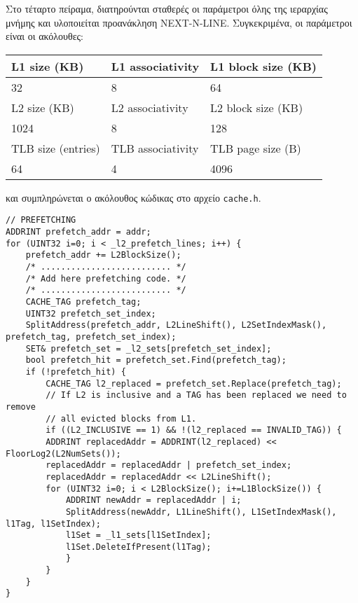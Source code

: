 \documentclass{article}
\newcommand{\eng}[1]{\foreignlanguage{english}{#1}}
\begin{document}
Στο τέταρτο πείραμα, διατηρούνται σταθερές οι παράμετροι όλης της ιεραρχίας μνήμης και υλοποιείται προανάκληση \eng{NEXT-N-LINE}. Συγκεκριμένα, οι παράμετροι είναι οι ακόλουθες:

\begin{table}[h]
    \centering
    \begin{tabular}{|p{3cm}|p{3cm}|p{3cm}|}
        \hline
        L1 size (KB) & L1 associativity & L1 block size (KB)\\
        \hline
        \hline
        32 & 8 & 64\\
        L2 size (KB) & L2 associativity & L2 block size (KB)\\
        \hline
        \hline
        1024 & 8 & 128\\
        \hline
        TLB size (entries) & TLB associativity & TLB page size (B)\\
        \hline    
        \hline
        64 & 4 & 4096\\
        \hline
    \end{tabular}
\end{table}
\FloatBarrier

και συμπληρώνεται ο ακόλουθος κώδικας στο αρχείο \texttt{\eng{cache.h}}.

\begin{lstlisting}[style=Cstyle]
// PREFETCHING
ADDRINT prefetch_addr = addr;
for (UINT32 i=0; i < _l2_prefetch_lines; i++) {
    prefetch_addr += L2BlockSize();
    /* .......................... */
    /* Add here prefetching code. */
    /* .......................... */
    CACHE_TAG prefetch_tag;
    UINT32 prefetch_set_index;
    SplitAddress(prefetch_addr, L2LineShift(), L2SetIndexMask(), prefetch_tag, prefetch_set_index);
    SET& prefetch_set = _l2_sets[prefetch_set_index];
    bool prefetch_hit = prefetch_set.Find(prefetch_tag);
    if (!prefetch_hit) {
        CACHE_TAG l2_replaced = prefetch_set.Replace(prefetch_tag);
        // If L2 is inclusive and a TAG has been replaced we need to remove
        // all evicted blocks from L1.
        if ((L2_INCLUSIVE == 1) && !(l2_replaced == INVALID_TAG)) {
        ADDRINT replacedAddr = ADDRINT(l2_replaced) << FloorLog2(L2NumSets());
        replacedAddr = replacedAddr | prefetch_set_index;
        replacedAddr = replacedAddr << L2LineShift();
        for (UINT32 i=0; i < L2BlockSize(); i+=L1BlockSize()) {
            ADDRINT newAddr = replacedAddr | i;
            SplitAddress(newAddr, L1LineShift(), L1SetIndexMask(), l1Tag, l1SetIndex);
            l1Set = _l1_sets[l1SetIndex];
            l1Set.DeleteIfPresent(l1Tag);
            }
        }
    }
}

\end{lstlisting}
\end{document}
